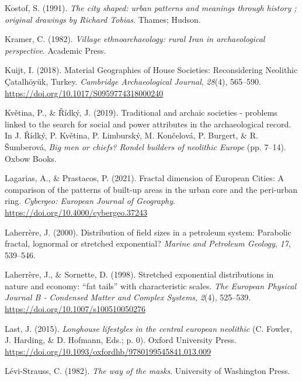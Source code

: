 \documentclass[
  12pt,
]{book}
\newlength{\cslhangindent}
\newlength{\cslentryspacingunit} %
\newenvironment{CSLReferences}[2] %
 {%
  \setlength{\parindent}{0pt}
  \ifodd #1
  \let\oldpar\par
  \def\par{\hangindent=\cslhangindent\oldpar}
  \fi
  \setlength{\parskip}{#2\cslentryspacingunit}
 }%
 {}
\begin{document}
\begin{CSLReferences}{1}{0}
\leavevmode{}%
Kostof, S. (1991). \emph{The city shaped: urban patterns and meanings through history ; original drawings by Richard Tobias}. Thames; Hudson.

\leavevmode{}%
Kramer, C. (1982). \emph{Village ethnoarchaeology: rural Iran in archaeological perspective}. Academic Press.

\leavevmode{}%
Kuijt, I. (2018). Material Geographies of House Societies: Reconsidering Neolithic Çatalhöyük, Turkey. \emph{Cambridge Archaeological Journal}, \emph{28}(4), 565--590. \url{https://doi.org/10.1017/S0959774318000240}

\leavevmode{}%
Květina, P., \& Řídký, J. (2019). Traditional and archaic societies - problems linked to the search for social and power attributes in the archaeological record. In J. Řídký, P. Květina, P. Limburský, M. Končelová, P. Burgert, \& R. Šumberová, \emph{Big men or chiefs? {Rondel} builders of neolithic {Europe}} (pp. 7--14). {Oxbow Books}.

\leavevmode{}%
Lagarias, A., \& Prastacos, P. (2021). Fractal dimension of European Cities: A comparison of the patterns of built-up areas in the urban core and the peri-urban ring. \emph{Cybergeo: European Journal of Geography}. \url{https://doi.org/10.4000/cybergeo.37243}

\leavevmode{}%
Laherrère, J. (2000). Distribution of field sizes in a petroleum system: Parabolic fractal, lognormal or stretched exponential? \emph{Marine and Petroleum Geology}, \emph{17}, 539--546.

\leavevmode{}%
Laherrère, J., \& Sornette, D. (1998). Stretched exponential distributions in nature and economy: {``}fat tails{''} with characteristic scales. \emph{The European Physical Journal B - Condensed Matter and Complex Systems}, \emph{2}(4), 525--539. \url{https://doi.org/10.1007/s100510050276}

\leavevmode{}%
Last, J. (2015). \emph{Longhouse lifestyles in the central european neolithic} (C. Fowler, J. Harding, \& D. Hofmann, Eds.; p. 0). Oxford University Press. \url{https://doi.org/10.1093/oxfordhb/9780199545841.013.009}

\leavevmode{}%
Lévi-Strauss, C. (1982). \emph{The way of the masks}. University of Washington Press.


\end{CSLReferences}
\end{document}
